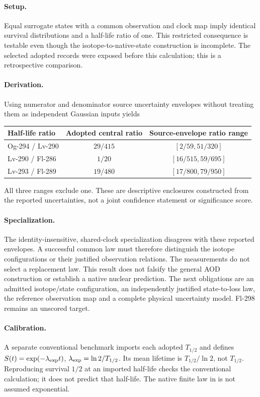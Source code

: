 \paragraph{Setup.}
Equal surrogate states with a common observation and clock map imply identical survival
distributions and a half-life ratio of one. This restricted consequence is testable even
though the isotope-to-native-state construction is incomplete. The selected adopted
records were exposed before this calculation; this is a retrospective comparison.

\paragraph{Derivation.}
Using numerator and denominator source uncertainty envelopes without treating them as
independent Gaussian inputs yields
\begin{center}
\begin{tabular}{lcc}
\toprule
Half-life ratio & Adopted central ratio & Source-envelope ratio range\\
\midrule
Og-294 / Lv-290 & \(29/415\) & \([2/59,51/320]\)\\
Lv-290 / Fl-286 & \(1/20\) & \([16/515,59/695]\)\\
Lv-293 / Fl-289 & \(19/480\) & \([17/800,79/950]\)\\
\bottomrule
\end{tabular}
\end{center}
All three ranges exclude one. These are descriptive enclosures constructed from the
reported uncertainties, not a joint confidence statement or significance score.

\paragraph{Specialization.}
The identity-insensitive, shared-clock specialization disagrees with these reported
envelopes. A successful common law must therefore distinguish the isotope configurations
or their justified observation relations. The measurements do not select a replacement
law. This result does not falsify the general AOD construction or establish a native
nuclear prediction. The next obligations are an admitted isotope/state configuration,
an independently justified state-to-loss law, the reference observation map and a complete
physical uncertainty model. Fl-298 remains an unscored target.

\paragraph{Calibration.}
A separate conventional benchmark imports each adopted \(T_{1/2}\) and defines
\(S(t)=\exp(-\lambda_{\rm exp}t)\),
\(\lambda_{\rm exp}=\ln2/T_{1/2}\). Its mean lifetime is
\(T_{1/2}/\ln2\), not \(T_{1/2}\). Reproducing survival \(1/2\) at an imported
half-life checks the conventional calculation; it does not predict that half-life.
The native finite law in  is not assumed exponential.

